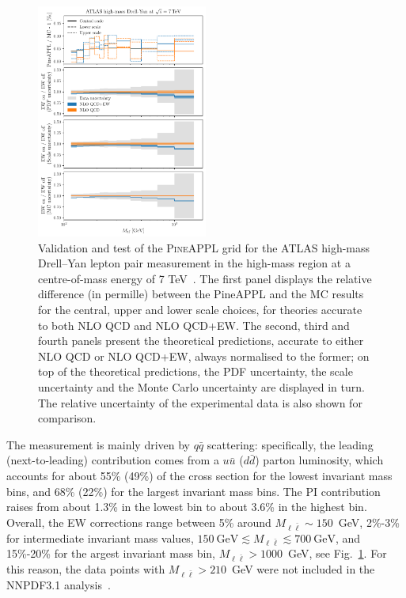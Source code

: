 \begin{figure}[!t]
    \centering
    \includegraphics[width=0.5\textwidth]{figures/pineappl_ATLASZHIGHMASS49FB}
    \caption{Validation and test of the \textsc{PineAPPL} grid for the ATLAS
      high-mass Drell--Yan lepton pair measurement in the high-mass region at
      a centre-of-mass energy of 7 TeV~\cite{Aad:2013iua}. The first panel
      displays the relative difference (in permille) between the {\sc PineAPPL}
      and the {\sc MC} results for the central, upper and lower scale choices,
      for theories accurate to both NLO QCD and NLO QCD+EW. The second, third
      and fourth panels present the theoretical predictions, accurate to either
      NLO QCD or NLO QCD+EW, always normalised to the former; on top of the
      theoretical predictions, the PDF uncertainty, the scale uncertainty and
      the Monte Carlo uncertainty are displayed in turn. The relative
      uncertainty of the experimental data is also shown for comparison.}
    \label{fig:atlaszhighmass49fb}
\end{figure}

The measurement is mainly driven by $q\bar q$ scattering: specifically, the
leading (next-to-leading) contribution comes from a $u\bar{u}$ ($d\bar{d}$)
parton luminosity, which accounts for about 55\% (49\%) of the cross section
for the lowest invariant mass bins, and 68\% (22\%) for the largest invariant
mass bins. The PI contribution raises from about 1.3\% in the lowest bin to
about 3.6\% in the highest bin. Overall, the EW corrections range between 5\%
around $M_{\ell\bar\ell}\sim 150$~GeV, 2\%-3\% for intermediate invariant mass
values, $150~\textrm{GeV}\lesssim M_{\ell\bar\ell}\lesssim 700~\textrm{GeV}$, and
15\%-20\% for the argest invariant mass bin, $M_{\ell\bar\ell}>1000$~GeV,
see Fig.~\ref{fig:atlaszhighmass49fb}. For this reason, the data points with
$M_{\ell\bar\ell}>210$~GeV were not included in the NNPDF3.1
analysis~\cite{Ball:2017nwa}.

